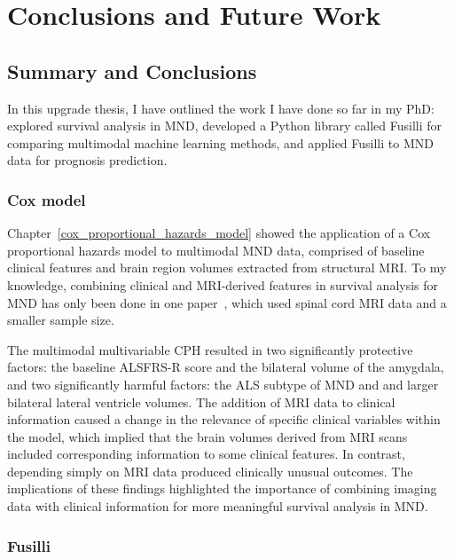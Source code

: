 \chapter{Conclusions and Future Work}
\label{conclusions_and_future_work}

\section{Summary and Conclusions}

In this upgrade thesis, I have outlined the work I have done so far in my PhD: explored survival analysis in MND, developed a Python library called Fusilli for comparing multimodal machine learning methods, and applied Fusilli to MND data for prognosis prediction.

\subsection{Cox model}

Chapter~\ref{cox_proportional_hazards_model} showed the application of a Cox proportional hazards model to multimodal MND data, comprised of baseline clinical features and brain region volumes extracted from structural MRI.
To my knowledge, combining clinical and MRI-derived features in survival analysis for MND has only been done in one paper~\cite{querinSpinalCordMultiparametric2017}, which used spinal cord MRI data and a smaller sample size.

The multimodal multivariable CPH resulted in two significantly protective factors: the baseline ALSFRS-R score and the bilateral volume of the amygdala, and two significantly harmful factors: the ALS subtype of MND and and larger bilateral lateral ventricle volumes.
The addition of MRI data to clinical information caused a change in the relevance of specific clinical variables within the model, which implied that the brain volumes derived from MRI scans included corresponding information to some clinical features.
In contrast, depending simply on MRI data produced clinically unusual outcomes.
The implications of these findings highlighted the importance of combining imaging data with clinical information for more meaningful survival analysis in MND.

\subsection{Fusilli}

